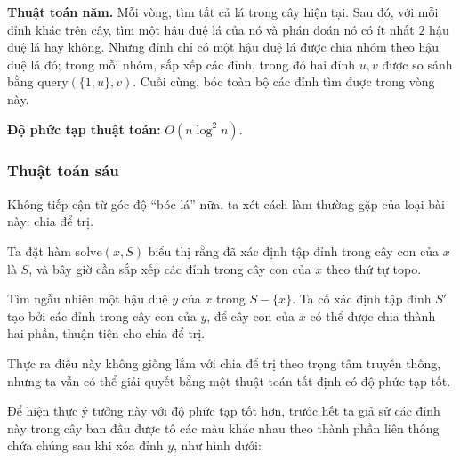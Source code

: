 \documentclass[11pt]{article}
\begin{document}
\textbf{Thuật toán năm.} Mỗi vòng, tìm tất cả lá trong cây hiện tại. Sau đó, với
mỗi đỉnh khác trên cây, tìm một hậu duệ lá của nó và phán đoán nó có ít nhất
\(2\) hậu duệ lá hay không. Những đỉnh chỉ có một hậu duệ lá được chia nhóm
theo hậu duệ lá đó; trong mỗi nhóm, sắp xếp các đỉnh, trong đó hai đỉnh \(u,v\)
được so sánh bằng \(\mathrm{query}(\{1,u\},v)\). Cuối cùng, bóc toàn bộ các đỉnh
tìm được trong vòng này.

\textbf{Độ phức tạp thuật toán:} \(O(n\log^2 n)\).

\subsubsection{Thuật toán sáu}

Không tiếp cận từ góc độ ``bóc lá'' nữa, ta xét cách làm thường gặp của loại
bài này: chia để trị.

Ta đặt hàm \(\mathrm{solve}(x,S)\) biểu thị rằng đã xác định tập đỉnh trong cây
con của \(x\) là \(S\), và bây giờ cần sắp xếp các đỉnh trong cây con của \(x\)
theo thứ tự topo.

Tìm ngẫu nhiên một hậu duệ \(y\) của \(x\) trong \(S-\{x\}\). Ta cố xác định tập
đỉnh \(S'\) tạo bởi các đỉnh trong cây con của \(y\), để cây con của \(x\) có
thể được chia thành hai phần, thuận tiện cho chia để trị.

Thực ra điều này không giống lắm với chia để trị theo trọng tâm truyền thống,
nhưng ta vẫn có thể giải quyết bằng một thuật toán tất định có độ phức tạp tốt.

Để hiện thực ý tưởng này với độ phức tạp tốt hơn, trước hết ta giả sử các đỉnh
này trong cây ban đầu được tô các màu khác nhau theo thành phần liên thông chứa
chúng sau khi xóa đỉnh \(y\), như hình dưới:

\begin{center}
\end{center}
\end{document}
